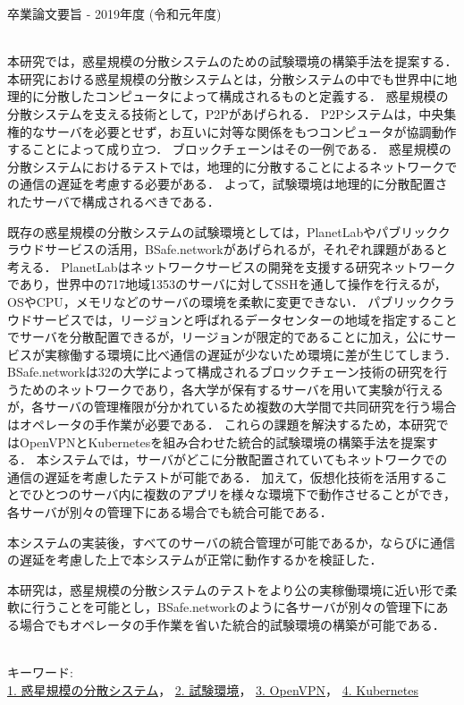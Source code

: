 卒業論文要旨 - 2019年度 (令和元年度)
\begin{center}
\begin{large}
\end{large}
\end{center}

~ \\
本研究では，惑星規模の分散システムのための試験環境の構築手法を提案する．
本研究における惑星規模の分散システムとは，分散システムの中でも世界中に地理的に分散したコンピュータによって構成されるものと定義する．
惑星規模の分散システムを支える技術として，P2Pがあげられる．
P2Pシステムは，中央集権的なサーバを必要とせず，お互いに対等な関係をもつコンピュータが協調動作することによって成り立つ．
ブロックチェーンはその一例である．
惑星規模の分散システムにおけるテストでは，地理的に分散することによるネットワークでの通信の遅延を考慮する必要がある．
よって，試験環境は地理的に分散配置されたサーバで構成されるべきである．

既存の惑星規模の分散システムの試験環境としては，PlanetLabやパブリッククラウドサービスの活用，BSafe.networkがあげられるが，それぞれ課題があると考える．
PlanetLabはネットワークサービスの開発を支援する研究ネットワークであり，世界中の717地域1353のサーバに対してSSHを通して操作を行えるが，OSやCPU，メモリなどのサーバの環境を柔軟に変更できない．
パブリッククラウドサービスでは，リージョンと呼ばれるデータセンターの地域を指定することでサーバを分散配置できるが，リージョンが限定的であることに加え，公にサービスが実稼働する環境に比べ通信の遅延が少ないため環境に差が生じてしまう．
BSafe.networkは32の大学によって構成されるブロックチェーン技術の研究を行うためのネットワークであり，各大学が保有するサーバを用いて実験が行えるが，各サーバの管理権限が分かれているため複数の大学間で共同研究を行う場合はオペレータの手作業が必要である．
これらの課題を解決するため，本研究ではOpenVPNとKubernetesを組み合わせた統合的試験環境の構築手法を提案する．
本システムでは，サーバがどこに分散配置されていてもネットワークでの通信の遅延を考慮したテストが可能である．
加えて，仮想化技術を活用することでひとつのサーバ内に複数のアプリを様々な環境下で動作させることができ，各サーバが別々の管理下にある場合でも統合可能である．

本システムの実装後，すべてのサーバの統合管理が可能であるか，ならびに通信の遅延を考慮した上で本システムが正常に動作するかを検証した．

本研究は，惑星規模の分散システムのテストをより公の実稼働環境に近い形で柔軟に行うことを可能とし，BSafe.networkのように各サーバが別々の管理下にある場合でもオペレータの手作業を省いた統合的試験環境の構築が可能である．

~ \\
キーワード:\\
\underline{1. 惑星規模の分散システム}，
\underline{2. 試験環境}，
\underline{3. OpenVPN}，
\underline{4. Kubernetes}

\begin{flushright}
\dept \\
\author
\end{flushright}
